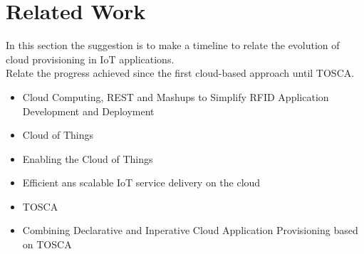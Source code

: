 \section{Related Work}
  In this section the suggestion is to make a timeline to relate the evolution of cloud provisioning in IoT
  applications.\\
  Relate the progress achieved since the first cloud-based approach until TOSCA.\\
  \begin{itemize}
    \item Cloud Computing, REST and Mashups to Simplify RFID Application Development and Deployment
    \item Cloud of Things
    \item Enabling the Cloud of Things
    \item Efficient ans scalable IoT service delivery on the cloud
    \item TOSCA
    \item Combining Declarative and Inperative Cloud Application Provisioning based on TOSCA
  \end{itemize}
\label{sec:Related Work}
